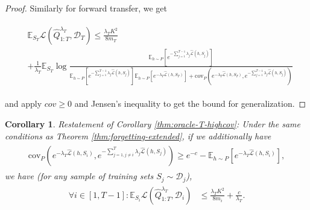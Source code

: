 \documentclass{article}
\theoremstyle{plain}
\newtheorem{corollary}[theorem]{Corollary}
\theoremstyle{definition}
\theoremstyle{remark}
\begin{document}
\begin{proof}
Similarly for forward transfer, we get 

\begin{align} \label{eq-oracle-forward-extend}
\begin{split}
&\mathbb{E}_{S_T}\mathcal{L}(\hat{Q}^{\lambda_T}_{1:T}, \mathcal{D}_T) \leq \frac{\lambda_T K^2}{8m_T}\\&+
\frac{1}{\lambda_T}\mathbb{E}_{S_T}\log\frac{\mathbb{E}_{h\sim P}\left [e^{-\sum_{j=1}^{T-1}\lambda_j\hat{\mathcal{L}}(h,S_j)} \right ]}{\mathbb{E}_{h\sim P}\left [e^{-\sum_{j=1}^{T-1}\lambda_j\hat{\mathcal{L}}(h,S_j)} \right ]\mathbb{E}_{h\sim P}\left [e^{-\lambda_T\hat{\mathcal{L}}(h,S_T)} \right ]+\mathrm{cov}_{P}(e^{-\lambda_T\hat{\mathcal{L}}(h,S_T)}, e^{-\sum_{j=1}^{T-1}\lambda_j\hat{\mathcal{L}}(h,S_j)})}
\end{split}
\end{align}

and apply $cov\geq 0$ and Jensen's inequality to get the bound for generalization.

\end{proof}


\begin{corollary} Restatement of Corollary \ref{thm:oracle-T-highcov}:
    Under the same conditions as Theorem \ref{thm:forgetting-extended}, if we additionally have
%
\begin{align*} 
\begin{split}
\mathrm{cov}_{P}(e^{-\lambda_T\hat{\mathcal{L}}(h,S_i)}, e^{-\sum_{j=1,j\neq i}^{T}\lambda_j\hat{\mathcal{L}}(h,S_j)})
 \geq e^{-c}-\mathbb{E}_{h\sim P}\left [e^{-\lambda_T\hat{\mathcal{L}}(h,S_i)} \right ],
\end{split}
\end{align*}
%
we have (for any sample of training sets $S_{j}\sim \mathcal{D}_j$),
%
\begin{align*} 
\begin{split}
\forall i\in[1,T-1]:
\mathbb{E}_{S_i}\mathcal{L}(\hat{Q}^{\lambda_T}_{1:T}, \mathcal{D}_i) &\leq \frac{\lambda_T K^2}{8m_i}+\frac{c}{\lambda_T}.
\end{split}
\end{align*}
\end{corollary}
\end{document}
